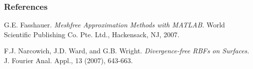 \documentclass{beamer}
\begin{document}
\begin{frame}[allowframebreaks]
  \frametitle<presentation>{References}
    
  \begin{thebibliography}{1}
    
      G{.}E{.} Fasshauer.
      \emph{Meshfree Approximation Methods with MATLAB.}
      World Scientific Publishing Co{.} Pte{.} Ltd{.},
      Hackensack, NJ, 2007.
 
    

      F{.}J{.} Narcowich, J{.}D{.} Ward, and G{.}B{.} Wright.
      \emph{Divergence-free RBFs on Surfaces.}
      J. Fourier Anal. Appl., 13 (2007), 643-663.
  \end{thebibliography}
\end{frame}
\end{document}
